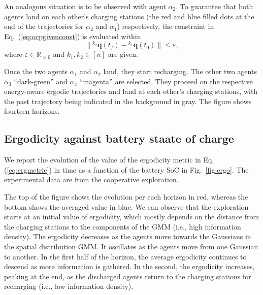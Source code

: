 \documentclass[letterpaper,10pt,conference,twoside]{IEEEtran}
\theoremstyle{definition}
\begin{document}
An analogous situation is to be observed with agent $\alpha_2$. %
To guarantee that both agents land %
on each other's charging stations (the red and blue filled dots at the end of the trajectories for $\alpha_2$ and $\alpha_1$) respectively, %
the constraint in Eq.~(\ref{eq:ocpgivenconst}) is evaluated within
\begin{equation}\label{eq:resaddconst}
  \lVert{}^{k_2}\mathbf{q}(t_f)-{}^{k_1}\mathbf{q}(t_0)\rVert\leq\varepsilon,
\end{equation} 
where $\varepsilon\in\mathbb{R}_{>0}$ and $k_1,k_2\in[n]$ are given.

Once the two agents $\alpha_1$ and $\alpha_2$ land, they start recharging. %
The other two agents $\alpha_3$ ``dark-green'' and $\alpha_4$ ``magenta'' are selected. %
They proceed on the respective energy-aware ergodic trajectories and land at each other's charging stations, with the past trajectory being indicated in the background in gray. The figure shows fourteen horizons. %

\subsection*{Ergodicity against battery staate of charge}
\noindent
We report the evolution of the value of the ergodicity metric in Eq. (\ref{eq:ergmetric}) in time as a function of the battery SoC in Fig.~\ref{fig:ergo}. The experimental data are from the cooperative exploration.%

The top of the figure shows the evolution per each horizon in red, whereas the bottom shows the averaged value in blue. We can observe that the exploration starts at an initial value of ergodicity, which mostly depends on the distance from the charging stations to the components of the GMM (i.e., high information density). The ergodicity decreases as the agents move towards the Gaussians in the spatial distribution GMM. It oscillates as the agents move from one Gaussian to another. In the first half of the horizon, the average ergodicity continues to descend as more information is gathered. In the second, the ergodicity increases, peaking at the end, as the discharged agents return to the charging stations for recharging (i.e., low information density).
\end{document}
